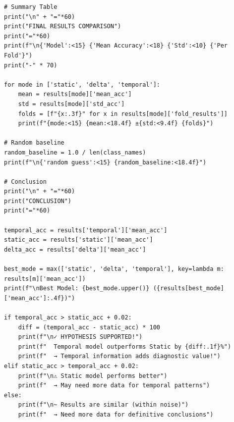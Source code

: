 \begin{lstlisting}
# Summary Table
print("\n" + "="*60)
print("FINAL RESULTS COMPARISON")
print("="*60)
print(f"\n{'Model':<15} {'Mean Accuracy':<18} {'Std':<10} {'Per Fold'}")
print("-" * 70)
 
for mode in ['static', 'delta', 'temporal']:
    mean = results[mode]['mean_acc']
    std = results[mode]['std_acc']
    folds = [f"{x:.3f}" for x in results[mode]['fold_results']]
    print(f"{mode:<15} {mean:<18.4f} ±{std:<9.4f} {folds}")
 
# Random baseline
random_baseline = 1.0 / len(class_names)
print(f"\n{'random guess':<15} {random_baseline:<18.4f}")
 
# Conclusion
print("\n" + "="*60)
print("CONCLUSION")
print("="*60)
 
temporal_acc = results['temporal']['mean_acc']
static_acc = results['static']['mean_acc']
delta_acc = results['delta']['mean_acc']
 
best_mode = max(['static', 'delta', 'temporal'], key=lambda m: results[m]['mean_acc'])
print(f"\nBest Model: {best_mode.upper()} ({results[best_mode]['mean_acc']:.4f})")
 
if temporal_acc > static_acc + 0.02:
    diff = (temporal_acc - static_acc) * 100
    print(f"\n✓ HYPOTHESIS SUPPORTED!")
    print(f"  Temporal model outperforms Static by {diff:.1f}%")
    print(f"  → Temporal information adds diagnostic value!")
elif static_acc > temporal_acc + 0.02:
    print(f"\n⚠ Static model performs better")
    print(f"  → May need more data for temporal patterns")
else:
    print(f"\n~ Results are similar (within noise)")
    print(f"  → Need more data for definitive conclusions")
\end{lstlisting}
 
